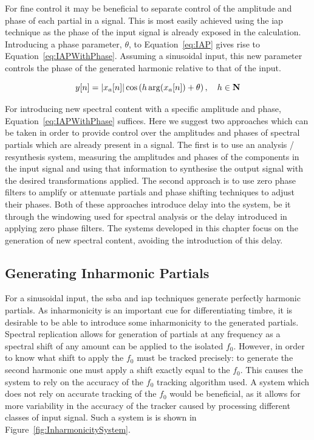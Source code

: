 		For fine control it may be beneficial to separate control of the amplitude and phase of each partial in a
		signal. This is most easily achieved using the \acrshort{iap} technique as the phase of the input signal is
		already exposed in the calculation. Introducing a phase parameter, $\theta$, to Equation~\ref{eq:IAP} gives
		rise to Equation~\ref{eq:IAPWithPhase}. Assuming a sinusoidal input, this new parameter controls the phase
		of the generated harmonic relative to that of the input. 

		\begin{equation}
			y[n] = \left|x_{a}[n]\right| \cos \left( h\arg(x_{a}[n]) + \theta \right), \quad h \in \textbf{N}
			\label{eq:IAPWithPhase}
		\end{equation}

		For introducing new spectral content with a specific amplitude and phase, Equation~\ref{eq:IAPWithPhase}
		suffices. Here we suggest two approaches which can be taken in order to provide control over the amplitudes
		and phases of spectral partials which are already present in a signal. The first is to use an analysis /
		resynthesis system, measuring the amplitudes and phases of the components in the input signal and using
		that information to synthesise the output signal with the desired transformations applied.  The second
		approach is to use zero phase filters to amplify or attenuate partials and phase shifting techniques to
		adjust their phases. Both of these approaches introduce delay into the system, be it through the windowing
		used for spectral analysis or the delay introduced in applying zero phase filters. The systems developed in
		this chapter focus on the generation of new spectral content, avoiding the introduction of this delay.

	\subsection{Generating Inharmonic Partials}
	\label{sec:FeatureControl-Systems-Inharmonicity}
		For a sinusoidal input, the \acrshort{ssba} and \acrshort{iap} techniques generate perfectly harmonic
		partials. As inharmonicity is an important cue for differentiating timbre, it is desirable to be able to
		introduce some inharmonicity to the generated partials. Spectral replication allows for generation of
		partials at any frequency as a spectral shift of any amount can be applied to the isolated $f_{0}$.
		However, in order to know what shift to apply the $f_{0}$ must be tracked precisely: to generate the second
		harmonic one must apply a shift exactly equal to the $f_{0}$. This causes the system to rely on the
		accuracy of the $f_{0}$ tracking algorithm used. A system which does not rely on accurate tracking of the
		$f_{0}$ would be beneficial, as it allows for more variability in the accuracy of the tracker caused by
		processing different classes of input signal. Such a system is is shown in
		Figure~\ref{fig:InharmonicitySystem}.

